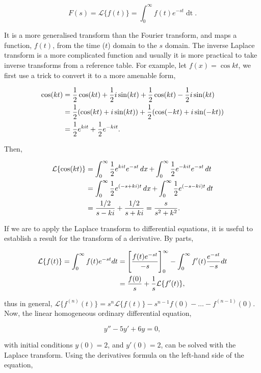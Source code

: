 \documentclass[11pt]{amsart}
\begin{document}
$$F(s) = \mathcal{L}\{f(t)\} = \int_{0}^{\infty} f(t)e^{-st}\mathop{dt}.$$

It is a more generalised transform than the Fourier transform, and maps a function, $f(t)$, from the time ($t$) domain to the $s$ domain. The inverse Laplace transform is a more complicated function and usually it is more practical to take inverse transforms from a reference table. For example, let $f(x) = \cos kt$, we first use a trick to convert it to a more amenable form,

\begin{align}
\cos(kt) &= \frac{1}{2}\cos(kt) + \frac{1}{2}i\sin(kt) + \frac{1}{2}\cos(kt) - \frac{1}{2}i\sin(kt) \notag \\
&= \frac{1}{2}(\cos(kt) + i\sin(kt)) + \frac{1}{2}(\cos(-kt) + i\sin(-kt)) \notag \\
&= \frac{1}{2}e^{kit} + \frac{1}{2}e^{-kit}. \notag
\end{align}

Then,

\begin{align}
\mathcal{L}\{\cos(kt)\} &= \int_{0}^{\infty} \frac{1}{2}e^{kit}e^{-st} \mathop{dx} + \int_{0}^{\infty} \frac{1}{2}e^{-kit}e^{-st} \mathop{dt} \notag \\
&= \int_{0}^{\infty} \frac{1}{2}e^{(-s + ki)t} \mathop{dx} + \int_{0}^{\infty} \frac{1}{2}e^{(-s - ki)t}\mathop{dt} \notag \\
&= \frac{1/2}{s - ki} + \frac{1/2}{s + ki} = \frac{s}{s^2 + k^2}. \notag
\end{align}

If we are to apply the Laplace transform to differential equations, it is useful to establish a result for the transform of a derivative. By parts,

\begin{align}
\mathcal{L}\{f(t)\} = \int_{0}^{\infty} f(t)e^{-st}dt &= \Bigg[\frac{f(t)e^{-st}}{-s}\Bigg]_0^{\infty} - \int_{0}^{\infty} f'(t)\frac{e^{-st}}{-s}dt \notag \\
&= \frac{f(0)}{s} + \frac{1}{s}\mathcal{L}\{f'(t)\} \notag,
\end{align}

thus in general, $\mathcal{L}\{f^{(n)}(t)\} = s^n \mathcal{L}\{f(t)\} - s^{n-1}f(0) - \dots - f^{(n-1)}(0)$. Now, the linear homogeneous ordinary differential equation,

$$y'' - 5y' + 6y = 0,$$

with initial conditions $y(0) = 2$, and $y'(0) = 2$, can be solved with the Laplace transform. Using the derivatives formula on the left-hand side of the equation,
\end{document}
